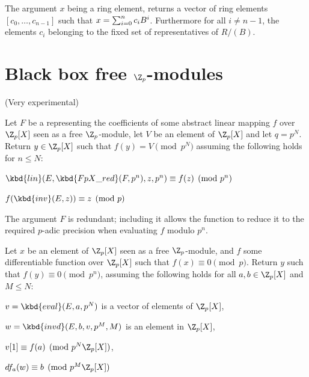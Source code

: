 The argument $x$ being a ring element,  returns a vector of
ring elements $[c_0,\ldots,c_{n-1}]$ such that $x = \sum_{i=0}^n c_i\*B^i$.
Furthermore for all $i\ne n-1$, the elements $c_i$ belonging to the fixed set
of representatives of $R/(B)$.

\section{Black box free $\Z_p$-modules}

(Very experimental)


Let $F$ be a  representing the coefficients of some abstract
linear mapping $f$ over $\Z_p[X]$ seen as a free $\Z_p$-module, let $V$ be
an element of $\Z_p[X]$ and let $q = p^N$.  Return $y\in\Z_p[X]$ such that
$f(y)=V\pmod{p^N}$ assuming the following holds for $n\leq N$:

\item $\kbd{lin}(E, \kbd{FpX\_red}(F, p^n), z, p^n) \equiv f(z) \pmod{p^n}$

\item $f(\kbd{inv}(E, z)) \equiv z \pmod{p}$

The argument $F$ is redundant; including it allows the function
to reduce it to the required $p$-adic precision when evaluating $f$ modulo
$p^n$.


Let $x$ be an element of $\Z_p[X]$ seen as a free  $\Z_p$-module, and $f$
some differentiable function over $\Z_p[X]$ such that $f(x) \equiv 0
\pmod{p}$. Return $y$ such that $f(y) \equiv 0\pmod{p^n}$, assuming the
following holds for all $a, b\in \Z_p[X]$ and $M\leq N$:

\item $v = \kbd{eval}(E,a,p^N)$ is a vector of elements of $\Z_p[X]$,

\item $w = \kbd{invd}(E,b,v,p^M,M)$ is an element in $\Z_p[X]$,

\item $v[1] \equiv f(a) \pmod{p^N\Z_p[X]}$,

\item $df_a(w) \equiv b \pmod{p^M\Z_p[X]}$

